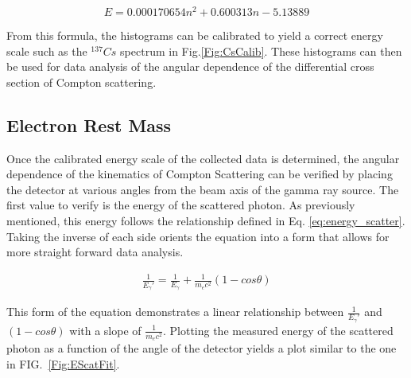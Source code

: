 \documentclass[%
 reprint,
 amsmath,amssymb,
 aps,
 pra,
]{revtex4-1}
\begin{document}
\begin{equation*}
E = 0.000170654 n^2 + 0.600313 n - 5.13889
\end{equation*}

From this formula, the histograms can be calibrated to yield a correct energy scale such as the $^{137}Cs$ spectrum in Fig.\ref{Fig:CsCalib}. These histograms can then be used for data analysis of the angular dependence of the differential cross section of Compton scattering.

\subsection{Electron Rest Mass}

Once the calibrated energy scale of the collected data is determined, the angular dependence of the kinematics of Compton Scattering can be verified by placing the detector at various angles from the beam axis of the gamma ray source. The first value to verify is the energy of the scattered photon. As previously mentioned, this energy follows the relationship defined in Eq. \ref{eq:energy_scatter}. Taking the inverse of each side orients the equation into a form that allows for more straight forward data analysis.

\begin{gather*}\label{eq:energy_scatter2}
	\frac{1}{E_\gamma '} = \frac{1}{E_\gamma} + \frac{1}{m_{e}c^{2}}(1 - cos\theta)
\end{gather*}

This form of the equation demonstrates a linear relationship between $\frac{1}{E_\gamma '}$ and $(1 - cos\theta)$ with a slope of $\frac{1}{m_{e}c^{2}}$. Plotting the measured energy of the scattered photon as a function of the angle of the detector yields a plot similar to the one in FIG.~\ref{Fig:EScatFit}.
\end{document}
